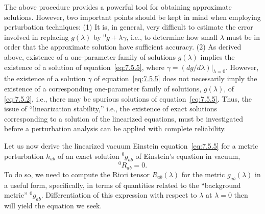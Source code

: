 The above procedure provides a powerful tool for obtaining approximate solutions.
However, two important points should be kept in mind when employing perturbation
techniques: (1) It is, in general, very difficult to estimate the error involved in
replacing \(g(\lambda)\) by \({}^{0}g+\lambda\gamma\), i.e., to determine how
small \(\lambda\) must be in order that the approximate solution have sufficient
accuracy. (2) As derived above, existence of a one-parameter family of solutions
\(g(\lambda)\) implies the existence of a solution of equation~\eqref{eq:7.5.5},
where \(\gamma=(dg/d\lambda)|_{\lambda=0}\). However, the existence of a
solution \(\gamma\) of equation~\eqref{eq:7.5.5} does not necessarily imply the
existence of a corresponding one-parameter family of solutions, \(g(\lambda)\), of
\eqref{eq:7.5.2}, i.e., there may be spurious solutions of
equation~\eqref{eq:7.5.5}. Thus, the issue of “linearization stability,” i.e., the
existence of exact solutions corresponding to a solution of the linearized equations,
must be investigated before a perturbation analysis can be applied with complete
reliability.

Let us now derive the linearized vacuum Einstein equation~\eqref{eq:7.5.5} for a
metric perturbation \(h_{ab}\) of an exact solution \({}^{0}g_{ab}\) of Einstein's
equation in vacuum,
\begin{equation}
  {}^{0}R_{ab}=0 .
  \tag{7.5.6}\label{eq:7.5.6}
\end{equation}
To do so, we need to compute the Ricci tensor \(R_{ab}(\lambda)\) for the metric
\(g_{ab}(\lambda)\) in a useful form, specifically, in terms of quantities related to
the “background metric” \({}^{0}g_{ab}\). Differentiation of this expression with
respect to \(\lambda\) at \(\lambda=0\) then will yield the equation we seek.

